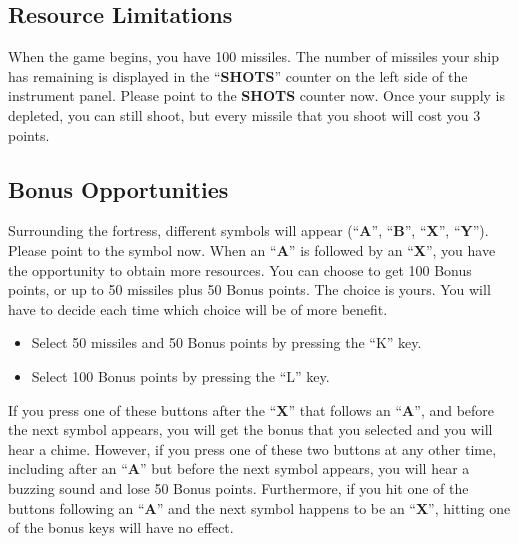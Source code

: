 \documentclass[letterpaper,12pt]{article}
\begin{document}
\subsection{Resource Limitations}

When the game begins, you have 100 missiles. The number of missiles your ship has
remaining is displayed in the ``\textbf{SHOTS}'' counter on the left side of the instrument panel.
Please point to the \textbf{SHOTS} counter now. Once your supply is depleted, you can still shoot,
but every missile that you shoot will cost you 3 points.

\subsection{Bonus Opportunities}

Surrounding the fortress, different symbols will appear (``\textbf{A}'', ``\textbf{B}'',
``\textbf{X}'', ``\textbf{Y}''). Please point to the symbol now. When an ``\textbf{A}'' is followed
by an ``\textbf{X}'', you have the opportunity to obtain more resources. You can choose to get 100
Bonus points, or up to 50 missiles plus 50 Bonus points. The choice is yours. You will have to
decide each time which choice will be of more benefit.
\begin{itemize}
\item Select 50 missiles and 50 Bonus points by pressing the ``K'' key.
\item Select 100 Bonus points by pressing the ``L'' key.
\end{itemize}
 
If you press one of these buttons after the ``\textbf{X}'' that follows an ``\textbf{A}'', and
before the next symbol appears, you will get the bonus that you selected and you will hear a chime.
However, if you press one of these two buttons at any other time, including after an ``\textbf{A}''
but before the next symbol appears, you will hear a buzzing sound and lose 50 Bonus points.
Furthermore, if you hit one of the buttons following an ``\textbf{A}'' and the next symbol happens
to be an ``\textbf{X}'', hitting one of the bonus keys will have no effect.


\end{document}
